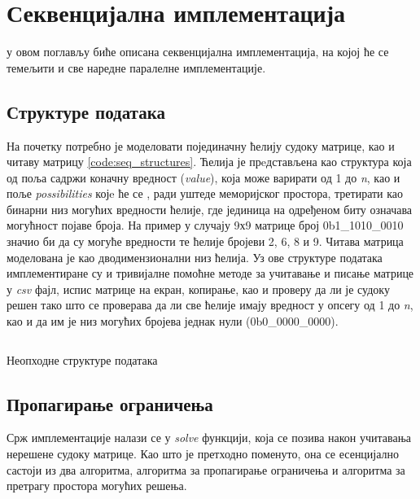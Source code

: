 \section{Секвенцијална имплементација}\label{sec:sequential}
у овом поглављу биће описана секвенцијална имплементација, на којој ће се темељити и све наредне паралелне имплементације.

\subsection{Структуре података}

На почетку потребно је моделовати појединачну ћелију судоку матрице, као и читаву матрицу \ref{code:seq_structures}. Ћелија је прeдстављена као структура која од поља садржи коначну вредност (\textit{value}), која може варирати од 1 до \textit{n}, као и поље \textit{possibilities} којe ће се , ради уштеде меморијског простора, третирати као бинарни низ могућих вредности ћелије, где јединица на одређеном биту означава могућност појаве броја. На пример у случају 9х9 матрице број 0b1\_1010\_0010 значио би да су могуће вредности те ћелије бројеви 2, 6, 8 и 9. Читава матрица моделована је као дводимензионални низ ћелија. Уз ове структуре података имплементиране су и тривијалне помоћне методе за учитавање и писање матрице у \textit{csv} фајл, испис матрице на екран, копирање, као и проверу да ли је судоку решен тако што се проверава да ли све ћелије имају вредност у опсегу од 1 до \textit{n}, као и да им је низ могућих бројева једнак нули (0b0\_0000\_0000).

\begin{listing}[H]
\inputminted{c}{kodovi/seq_structures.c}
\caption{Неопходне структуре података}
\label{code:seq_structures}
\end{listing}

\subsection{Пропагирање ограничења}\label{constraint_prop}

Срж имплементације налази се у  \textit{solve} функцији, која се позива након учитавања нерешене судоку матрице. Као што је претходно поменуто, она се есенцијално састоји из два алгоритма, алгоритма за пропагирање   ограничења и алгоритма за претрагу простора могућих решења.\\

